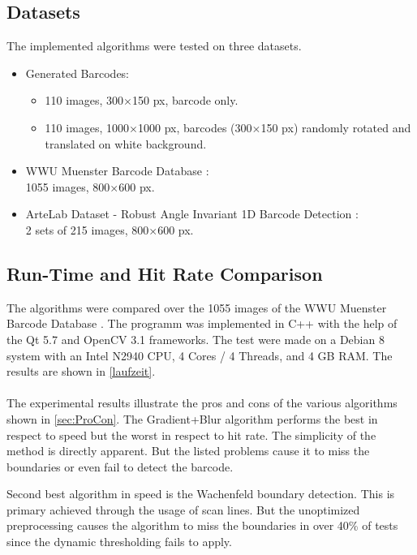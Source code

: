 \subsection{Datasets}
The implemented algorithms were tested on three datasets.
\begin{itemize}
\item Generated Barcodes:
\begin{itemize}
\item 110 images, 300$\times$150 px, barcode only.
\item 110 images, 1000$\times$1000 px, barcodes (300$\times$150 px) randomly rotated and translated on white background.
\end{itemize}
\item WWU Muenster Barcode Database \cite{MuensterBarcodeDB} \citep{wachenfeld2008robust}:\\
1055 images, 800$\times$600 px.
\item ArteLab Dataset - Robust Angle Invariant 1D Barcode Detection \cite{ArteLabDB} \cite{zamberletti2010neural} \citep{zamberletti2013robust}:\\
2 sets of 215 images, 800$\times$600 px.
\end{itemize}

\subsection{Run-Time and Hit Rate Comparison}
The algorithms were compared over the 1055 images of the WWU Muenster Barcode Database \citep{MuensterBarcodeDB}. The programm was implemented in C++ with the help of the Qt 5.7 and OpenCV 3.1 frameworks. The test were made on a Debian 8 system with an Intel N2940 CPU, 4 Cores / 4 Threads, and 4 GB RAM. The results are shown in \cref{laufzeit}.
\\
\\
The experimental results illustrate the pros and cons of the various algorithms shown in \cref{sec:ProCon}. The Gradient+Blur algorithm performs the best in respect to speed but the worst in respect to hit rate. The simplicity of the method is directly apparent. But the listed problems cause it to miss the boundaries or even fail to detect the barcode.

Second best algorithm in speed is the Wachenfeld boundary detection. This is primary achieved through the usage of scan lines. But the unoptimized preprocessing causes the algorithm to miss the boundaries in over 40\% of tests since the dynamic thresholding fails to apply.

